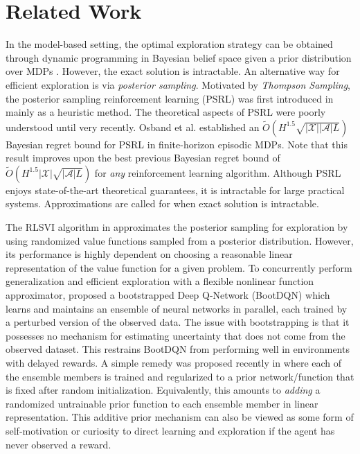 \documentclass[letterpaper]{article} %
\newcommand{\Sp}[1]{\left(#1\right)}
\newcommand{\abs}[1]{\left|#1\right|}
\newcommand{\aX}{\abs{\mathcal{X}}}
\newcommand{\aA}{\abs{\mathcal{A}}}
\theoremstyle{definition}
\begin{document}
\section{Related Work}
In the model-based setting, the optimal exploration strategy can be obtained through dynamic programming in Bayesian belief space given a prior distribution over MDPs \cite{guez2012efficient}. However, the exact solution is intractable. An alternative way for efficient exploration is via \emph{posterior sampling}. Motivated by \emph{Thompson Sampling}, the posterior sampling reinforcement learning (PSRL) was first introduced in \cite{strens2000bayesian} mainly as a heuristic method. The theoretical aspects of PSRL were poorly understood until very recently. Osband et al. \cite{osband2017posterior} established an $\widetilde{O}\Sp{H^{1.5}\sqrt{\aX\aA L}}$ Bayesian regret bound for PSRL in finite-horizon episodic MDPs. Note that this result improves upon the best previous Bayesian regret bound of $\widetilde{O}\Sp{H^{1.5}\aX\sqrt{\aA L}}$ for \emph{any} reinforcement learning algorithm. Although PSRL enjoys state-of-the-art theoretical guarantees, it is intractable for large practical systems. Approximations are called for when exact solution is intractable. 

The RLSVI algorithm in \cite{osband2017deep} approximates the posterior sampling for exploration by using randomized value functions sampled from a posterior distribution. However, its performance is highly dependent on choosing a reasonable linear representation of the value function for a given problem. To concurrently perform generalization and efficient exploration with a flexible nonlinear function approximator, \cite{osband2016deep} proposed a bootstrapped Deep Q-Network (BootDQN) which learns and maintains an ensemble of neural networks in parallel, each trained by a perturbed version of the observed data. The issue with bootstrapping is that it possesses no mechanism for estimating uncertainty that does not come from the observed dataset. This restrains BootDQN from performing well in environments with delayed rewards. A simple remedy was proposed recently in \cite{osband2018randomized} where each of the ensemble members is trained and regularized to a prior network/function that is fixed after random initialization. Equivalently, this amounts to \emph{adding} a randomized untrainable prior function to each ensemble member in linear representation. This additive prior mechanism can also be viewed as some form of self-motivation or curiosity to direct learning and exploration if the agent has never observed a reward. 
\end{document}
